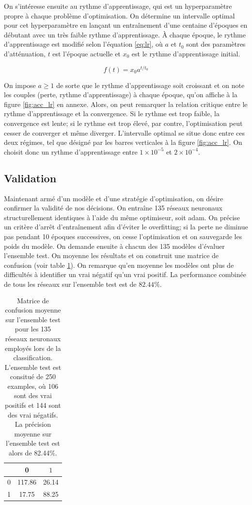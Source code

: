 \documentclass{article}
\begin{document}
On s'intéresse ensuite au rythme d'apprentissage, qui est un hyperparamètre propre à chaque problème d'optimisation. On détermine un intervalle optimal pour cet hyperparamètre en lançant un entraînement d'une centaine d'époques en débutant avec un très faible rythme d'apprentissage. À chaque époque, le rythme d'apprentissage est modifié selon l'équation \ref{eq:lr}, où  $a$ et $t_0$ sont des paramètres d'atténuation, $t$ est l'époque actuelle et $x_0$ est le rythme d'apprentissage initial.

\begin{equation}\label{eq:lr}
	f(t) = x_0 a^{t/t_0}
\end{equation}

On impose $a \ge 1$ de sorte que le rythme d'apprentissage soit croissant et on note les couples (perte, rythme d'apprentissage) à chaque époque, qu'on affiche à la figure \ref{fig:acc_lr} en annexe. Alors, on peut remarquer la relation critique entre le rythme d'apprentissage et la convergence. Si le rythme est trop faible, la convergence est lente; si le rythme est trop élevé, par contre, l'optimisation peut cesser de converger et même diverger. L'intervalle optimal se situe donc entre ces deux régimes, tel que désigné par les barres verticales à la figure \ref{fig:acc_lr}. On choisit donc un rythme d'apprentissage entre $1\times10^{-5}$ et $2\times10^{-4}$.

\subsection{Validation}

Maintenant armé d'un modèle et d'une stratégie d'optimisation, on désire confirmer la validité de nos décisions. On entraîne 135 réseaux neuronaux structurellement identiques à l'aide du même optimiseur, soit adam. On précise un critère d'arrêt d'entraînement afin d'éviter le overfitting; si la perte ne diminue pas pendant 10 époques successives, on cesse l'optimisation et on sauvegarde les poids du modèle. On demande ensuite à chacun des 135 modèles d'évaluer l'ensemble test. On moyenne les résultats et on construit une matrice de confusion (voir table \ref{tab:confusion_matrix}). On remarque qu'en moyenne les modèles ont plus de difficultés à identifier un vrai négatif qu'un vrai positif. La performance combinée de tous les réseaux sur l'ensemble test est de $82.44\%$.

\begin{table}[H]
	\begin{center}
		\begin{tabular}{|c|c|c|}
			\hline
			& 0 & $1$ \\\hline
			0 & 117.86 & 26.14\\
			1 & 17.75 & 88.25\\\hline
		\end{tabular}
	\end{center}
	\caption{Matrice de confusion moyenne sur l'ensemble test pour les 135 réseaux neuronaux employés lors de la classification. L'ensemble test est consitué de 250 examples, où 106 sont des vrai positifs et 144 sont des vrai négatifs. La précision moyenne sur l'ensemble test est alors de 82.44\%.}
	\label{tab:confusion_matrix}
\end{table}
\end{document}
